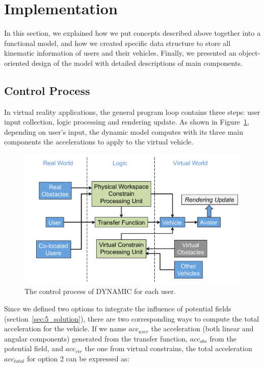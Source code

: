
\section{Implementation}
In this section, we explained how we put concepts described above together into a functional model, and how we created specific data structure to store all kinematic information of users and their vehicles. Finally, we presented an object-oriented design of the model with detailed descriptions of main components.

\subsection{Control Process}
In virtual reality applications, the general program loop contains three steps: user input collection, logic processing and rendering update. As shown in Figure~\ref{fig:5_process}, depending on user's input, the dynamic model computes with its three main components the accelerations to apply to the virtual vehicle.

\begin{figure}[htb]
  \centering
  \includegraphics[width=.9\textwidth]{figures/ch5/process}
  \caption{\label{fig:5_process}The control process of DYNAMIC for each user.}
\end{figure}

Since we defined two options to integrate the influence of potential fields (section~\ref{sec:5_solution}), there are two corresponding ways to compute the total acceleration for the vehicle. If we name $acc_{user}$ the acceleration (both linear and angular components) generated from the transfer function, $acc_{obs}$ from the potential field, and $acc_{vir}$ the one from virtual constrains, the total acceleration $acc_{total}$ for option 2 can be expressed as:

